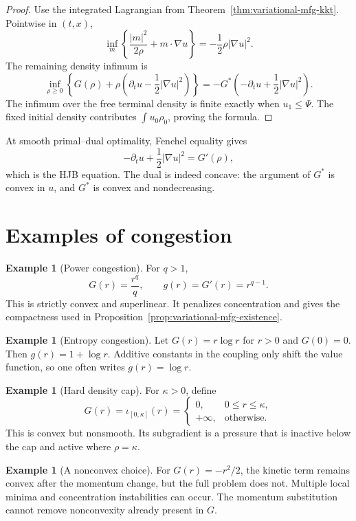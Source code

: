 \documentclass[11pt,a4paper]{article}
\theoremstyle{definition}
\newtheorem{example}[theorem]{Example}
\newcommand{\abs}[1]{\left\lvert#1\right\rvert}
\newcommand{\ind}{\iota}
\begin{document}
\begin{proof}
Use the integrated Lagrangian from
Theorem~\ref{thm:variational-mfg-kkt}. Pointwise in \((t,x)\),
\[
  \inf_m\left\{\frac{\abs m^2}{2\rho}+m\cdot\nabla u\right\}
  =-\frac12\rho\abs{\nabla u}^2.
\]
The remaining density infimum is
\[
  \inf_{\rho\geq0}
  \left\{G(\rho)+\rho\left(
    \partial_tu-\frac12\abs{\nabla u}^2\right)\right\}
  =
  -G^*\left(-\partial_tu+\frac12\abs{\nabla u}^2\right).
\]
The infimum over the free terminal density is finite exactly when
\(u_1\leq\Psi\). The fixed initial density contributes
\(\int u_0\rho_0\), proving the formula.
\end{proof}

At smooth primal--dual optimality, Fenchel equality gives
\[
  -\partial_tu+\frac12\abs{\nabla u}^2=G'(\rho),
\]
which is the HJB equation. The dual is indeed concave: the argument of
\(G^*\) is convex in \(u\), and \(G^*\) is convex and nondecreasing.

\section{Examples of congestion}

\begin{example}[Power congestion]
For \(q>1\),
\[
  G(r)=\frac{r^q}{q},\qquad g(r)=G'(r)=r^{q-1}.
\]
This is strictly convex and superlinear. It penalizes concentration and gives
the compactness used in Proposition~\ref{prop:variational-mfg-existence}.
\end{example}

\begin{example}[Entropy congestion]
Let \(G(r)=r\log r\) for \(r>0\) and \(G(0)=0\). Then
\(g(r)=1+\log r\). Additive constants in the coupling only shift the value
function, so one often writes \(g(r)=\log r\).
\end{example}

\begin{example}[Hard density cap]
For \(\kappa>0\), define
\[
  G(r)=\ind_{[0,\kappa]}(r)
  =
  \begin{cases}
    0,&0\leq r\leq\kappa,\\
    +\infty,&\text{otherwise}.
  \end{cases}
\]
This is convex but nonsmooth. Its subgradient is a pressure that is inactive
below the cap and active where \(\rho=\kappa\).
\end{example}

\begin{example}[A nonconvex choice]
For \(G(r)=-r^2/2\), the kinetic term remains convex after the momentum
change, but the full problem does not. Multiple local minima and concentration
instabilities can occur. The momentum substitution cannot remove
nonconvexity already present in \(G\).
\end{example}
\end{document}
